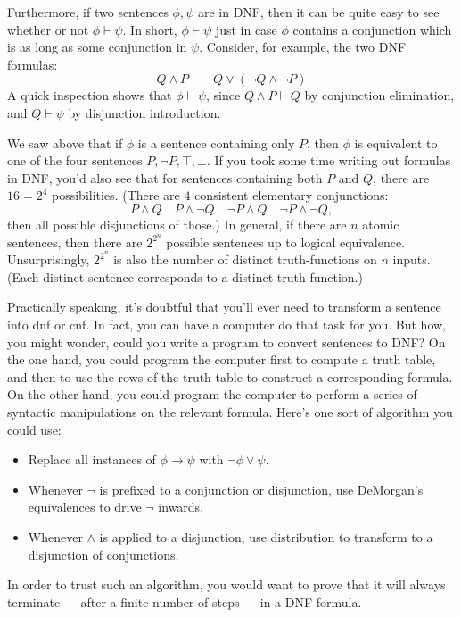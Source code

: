 Furthermore, if two sentences $\phi,\psi$ are in DNF, then it can be
quite easy to see whether or not $\phi\vdash\psi$.  In short,
$\phi\vdash\psi$ just in case $\phi$ contains a conjunction which is
as long as some conjunction in $\psi$.  Consider, for example, the two
DNF formulas:
\[ Q\wedge P \qquad Q\vee (\neg Q\wedge \neg P) \] A quick inspection
shows that $\phi\vdash\psi$, since $Q\wedge P\vdash Q$ by conjunction
elimination, and $Q\vdash\psi$ by disjunction introduction.

We saw above that if $\phi$ is a sentence containing only $P$, then
$\phi$ is equivalent to one of the four sentences
$P,\neg P,\top ,\bot$.  If you took some time writing out formulas in
DNF, you'd also see that for sentences containing both $P$ and $Q$,
there are $16=2^4$ possibilities.  (There are $4$ consistent
elementary conjunctions:
\[ P\wedge Q \quad P\wedge \neg Q \quad \neg P\wedge Q \quad \neg
  P\wedge\neg Q ,\] then all possible disjunctions of those.)  In
general, if there are $n$ atomic sentences, then there are $2^{2^n}$
possible sentences up to logical equivalence.  Unsurprisingly,
$2^{2^n}$ is also the number of distinct truth-functions on $n$
inputs.  (Each distinct sentence corresponds to a distinct
truth-function.)


Practically speaking, it's doubtful that you'll ever need to transform
a sentence into \gls{dnf} or \gls{cnf}.  In fact, you can have a
computer do that task for you.  But how, you might wonder, could you
write a program to convert sentences to DNF?  On the one hand, you
could program the computer first to compute a truth table, and then to
use the rows of the truth table to construct a corresponding formula.
On the other hand, you could program the computer to perform a series
of syntactic manipulations on the relevant formula.  Here's one sort
of algorithm you could use:
\begin{itemize}
\item Replace all instances of $\phi\to \psi$ with
  $\neg\phi\vee \psi$.
\item Whenever $\neg$ is prefixed to a conjunction or disjunction, use
  DeMorgan's equivalences to drive $\neg$ inwards.
\item Whenever $\wedge$ is applied to a disjunction, use distribution
  to transform to a disjunction of conjunctions.  
\end{itemize}
In order to trust such an algorithm, you would want to prove that it
will always terminate --- after a finite number of steps --- in a DNF
formula.  

